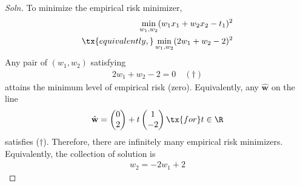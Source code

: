 \documentclass{article}
\begin{document}
	\subsubsection{}
	\begin{proof}[Soln]
		To minimize the empirical risk minimizer, 
		\begin{align}
			\min_{w_1, w_2} (w_1 x_1 + w_2 x_2 - t_1)^2 \\
			\tx{equivalently, } \min_{w_1, w_2} (2 w_1 + w_2 - 2)^2
		\end{align}
		Any pair of $(w_1, w_2)$ satisfying
		\begin{align}
			2 w_1 + w_2 - 2 = 0\quad (\dagger)
		\end{align}
		attains the minimum level of empirical risk (zero). Equivalently, any $\hat{\textbf{w}}$ on the line
		\begin{align}
			\hat{\textbf{w}} = \begin{pmatrix}
				0 \\ 2
			\end{pmatrix} + t \begin{pmatrix}
				1 \\ -2
			\end{pmatrix} \tx{ for } t \in \R
		\end{align}
		satisfies ($\dagger$). Therefore, there are infinitely many empirical risk minimizers. \\
		Equivalently, the collection of solution is
		\begin{align}
			w_2 = -2 w_1 + 2
		\end{align}
	\end{proof}
\end{document}
